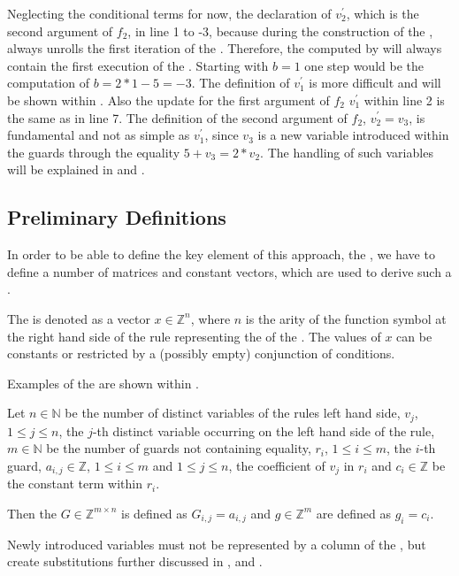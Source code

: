 Neglecting the conditional terms for now, the declaration of $v^\prime_2$, which is the second argument of $f_2$, in line 1 to -3, 
because during the construction of the \seg, \aprove always unrolls the first iteration of the \loopt. Therefore, the \stem computed by \aprove will always contain the first execution of the \loopt. Starting with $b=1$ one step would be the computation of $b = 2*1-5=-3$. The definition of $v^\prime_1$ is more difficult and will be shown within .
Also the update for the first argument of $f_2$ $v^\prime_1$ within line 2 is the same as in  line 7. The definition of the second argument of $f_2$, $v^\prime_2 = v_3$, is fundamental and not as simple as $v^\prime_1$, since $v_3$ is a new variable introduced within the guards through the equality $5+v_3=2*v_2$. The handling of such variables will be explained in  and . \newline

\subsection{Preliminary Definitions}
In order to be able to define the key element of this approach, the \gna, we have to define a number of matrices and constant vectors, which are used to derive such a \gna. 

\begin{definition}[\stem]
	The \stem is denoted as a vector $x \in \mathbb{Z}^n$, where $n$ is the arity of the function symbol at the right hand side of the rule representing the \stem of the \its. The values of $x$ can be constants or restricted by a (possibly empty) conjunction of conditions. 
\end{definition}
Examples of the \stem are shown within .

\begin{definition}
	\label{def:guard}
	Let $n \in \mathbb{N}$ be the number of distinct variables of the \loopt rules left hand side, $v_j$, $1 \le j \le n$, the $j$-th distinct variable occurring on the left hand side of the rule, $m \in \mathbb{N}$ be the number of guards not containing equality, $r_i$, $1\le i \le m$, the $i$-th guard, $a_{i,j} \in \mathbb{Z}$, $1 \le i \le m$ and $1\le j \le n$, the coefficient of $v_j$ in $r_i$ and $c_i \in \mathbb{Z}$ be the constant term within $r_i$.
	
	Then the \guardmatrix $G \in \mathbb{Z}^{m\times n}$ is defined as $G_{i,j}=a_{i,j} $ and \guardconstants $g \in \mathbb{Z}^m$ are defined as $g_i = c_i$.
	
	Newly introduced variables must not be represented by a column of the \guardmatrix, but create substitutions further discussed in ,  and .
\end{definition}

